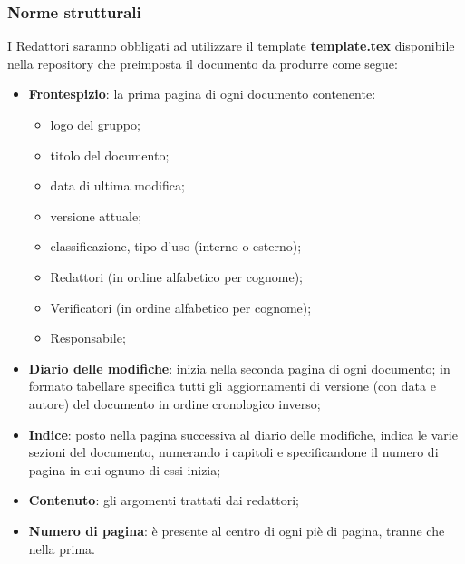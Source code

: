 	\subsubsection{Norme strutturali}
	I Redattori saranno obbligati ad utilizzare il template \textbf{template.tex} disponibile nella repository che preimposta il documento da produrre come segue:
	\begin{itemize}
		\item \textbf{Frontespizio}: la prima pagina di ogni documento contenente:
			\begin{itemize}
				\item logo del gruppo;
				\item titolo del documento;
				\item data di ultima modifica;
				\item versione attuale;
				\item classificazione, tipo d'uso (interno o esterno);
				\item Redattori (in ordine alfabetico per cognome);
				\item Verificatori (in ordine alfabetico per cognome);
				\item Responsabile;
			\end{itemize}
		\item \textbf{Diario delle modifiche}: inizia nella seconda pagina di ogni documento; in formato tabellare specifica tutti gli aggiornamenti di versione (con data e autore) del documento in ordine cronologico inverso;
		\item \textbf{Indice}: posto nella pagina successiva al diario delle modifiche, indica le varie sezioni del documento, numerando i capitoli e specificandone il numero di pagina in cui ognuno di essi inizia;
		\item \textbf{Contenuto}: gli argomenti trattati dai redattori;
		\item \textbf{Numero di pagina}: è presente al centro di ogni piè di pagina, tranne che nella prima.
	\end{itemize}
		
